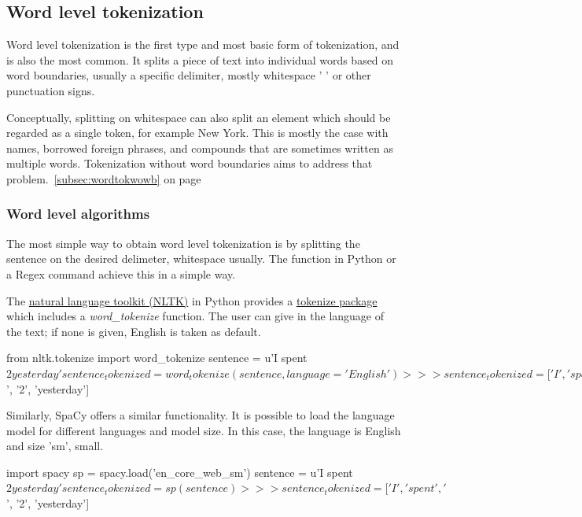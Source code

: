 \subsection{Word level tokenization}

Word level tokenization is the first type and most basic form of tokenization, and is also the most common. It splits a piece of text into individual words based on word boundaries, usually a specific delimiter, mostly whitespace ' ' or other punctuation signs.

Conceptually, splitting on whitespace can also split an element which should be regarded as a single token, for example New York. This is mostly the case with names, borrowed foreign phrases, and compounds that are sometimes written as multiple words. Tokenization without word boundaries aims to address that problem.~\ref{subsec:wordtokwowb} on page~\pageref{subsec:wordtokwowb}

\subsubsection{Word level algorithms}

The most simple way to obtain word level tokenization is by splitting the sentence on the desired delimeter, whitespace usually. The  function in Python or a Regex command  achieve this in a simple way.

The \href{https://www.nltk.org/}{natural language toolkit (NLTK)} in Python provides a \href{https://www.nltk.org/api/nltk.tokenize.html}{tokenize package} which includes a \emph{word\_tokenize} function. The user can give in the language of the text; if none is given, English is taken as default.

\begin{python}
from nltk.tokenize import word_tokenize
sentence = u'I spent $2 yesterday'
sentence_tokenized = word_tokenize(sentence, language='English')
>>> sentence_tokenized = ['I', 'spent', '$', '2', 'yesterday']
\end{python}

Similarly, SpaCy offers a similar functionality. It is possible to load the language model for different languages and model size. In this case, the language is English and size 'sm', small.

\begin{python}
import spacy
sp = spacy.load('en_core_web_sm')
sentence = u'I spent $2 yesterday'
sentence_tokenized = sp(sentence)
>>> sentence_tokenized = ['I', 'spent', '$', '2', 'yesterday']
\end{python}

